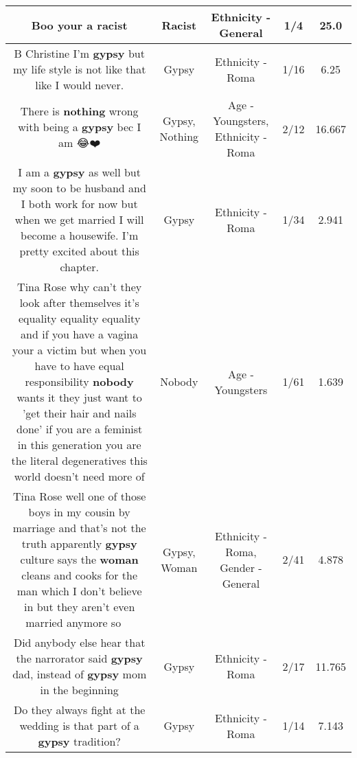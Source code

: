 \documentclass[11pt]{article}
\newlength\mylength
\begin{document}
\begin{center}
\begin{longtable}{|C{.65\mylength}|C{.30\mylength}|C{.12\mylength}|C{.12\mylength}|C{.12\mylength}|}
  \small Boo your a racist\normalsize   & Racist & Ethnicity - General & 1/4 & 25.0 \\  \hline
  \small B Christine I'm \textbf{gypsy} but my life style is not like that like I would never.\normalsize   & Gypsy & Ethnicity - Roma & 1/16 & 6.25 \\  \hline
  \small There is \textbf{nothing} wrong with being a \textbf{gypsy} bec I am 😂❤️\normalsize   & Gypsy, Nothing & Age - Youngsters, Ethnicity - Roma & 2/12 & 16.667 \\  \hline
  \small I am a \textbf{gypsy} as well but my soon to be husband and I both work for now but when we get married I will become a housewife. I'm pretty excited about this chapter.\normalsize   & Gypsy & Ethnicity - Roma & 1/34 & 2.941 \\  \hline
  \small Tina Rose why can't they look after themselves it's equality equality equality and if you have a vagina your a victim but when you have to have equal responsibility \textbf{nobody} wants it they just want to 'get their hair and nails done' if you are a feminist in this generation you are the literal degeneratives this world doesn't need more of\normalsize   & Nobody & Age - Youngsters & 1/61 & 1.639 \\  \hline
  \small Tina Rose well one of those boys in my cousin by marriage and that's not the truth apparently \textbf{gypsy} culture says the \textbf{woman} cleans and cooks for the man which I don't believe in but they aren't even married anymore so🤷🏻‍♀️😂\normalsize   & Gypsy, Woman & Ethnicity - Roma, Gender - General & 2/41 & 4.878 \\  \hline
  \small Did anybody else hear that the narrorator said \textbf{gypsy} dad, instead of \textbf{gypsy} mom in the beginning\normalsize   & Gypsy & Ethnicity - Roma & 2/17 & 11.765 \\  \hline
  \small Do they always fight at the wedding is that part of a \textbf{gypsy} tradition?\normalsize   & Gypsy & Ethnicity - Roma & 1/14 & 7.143 \\  \hline

\end{longtable}
\end{center}
\end{document}
